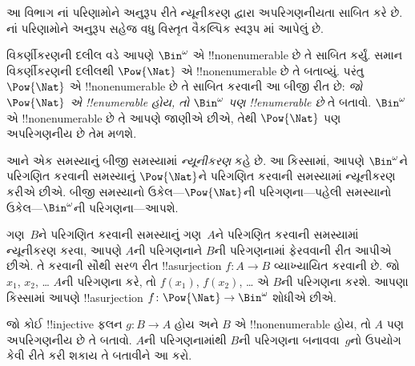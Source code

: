 \documentclass[../../../include/open-logic-section]{subfiles}
\begin{document}


\begin{editorial}
  આ વિભાગ નાં પરિણામોને અનુરૂપ રીતે
  ન્યૂનીકરણ દ્વારા અપરિગણનીયતા સાબિત કરે છે. નાં
  પરિણામોને અનુરૂપ
  સહેજ વધુ વિસ્તૃત વૈકલ્પિક સ્વરૂપ માં આપેલું છે.
\end{editorial}

વિકર્ણીકરણની દલીલ વડે આપણે $\Bin^\omega$ એ !!{nonenumerable}
છે તે સાબિત કર્યું. સમાન વિકર્ણીકરણની દલીલથી $\Pow{\Nat}$ એ
!!{nonenumerable} છે તે બતાવ્યું. પરંતુ $\Pow{\Nat}$ એ
!!{nonenumerable} છે તે સાબિત કરવાની
આ બીજી રીત છે:
\emph{જો $\Pow{\Nat}$ એ !!{enumerable} હોય, તો $\Bin^\omega$ પણ
!!{enumerable} છે} તે બતાવો. $\Bin^\omega$ એ !!{nonenumerable}
છે તે આપણે જાણીએ છીએ, તેથી $\Pow{\Nat}$ પણ અપરિગણનીય છે તેમ મળશે.

આને એક સમસ્યાનું બીજી સમસ્યામાં \emph{ન્યૂનીકરણ} કહે છે. આ કિસ્સામાં,
આપણે $\Bin^\omega$ને પરિગણિત કરવાની સમસ્યાનું $\Pow{\Nat}$ને
પરિગણિત કરવાની સમસ્યામાં ન્યૂનીકરણ કરીએ છીએ. બીજી સમસ્યાનો
ઉકેલ---$\Pow{\Nat}$ની પરિગણના---પહેલી સમસ્યાનો
ઉકેલ---$\Bin^\omega$ની પરિગણના---આપશે.

ગણ~$B$ને પરિગણિત કરવાની સમસ્યાનું ગણ~$A$ને પરિગણિત કરવાની
સમસ્યામાં ન્યૂનીકરણ કરવા, આપણે $A$ની પરિગણનાને $B$ની પરિગણનામાં
ફેરવવાની રીત આપીએ છીએ. તે કરવાની સૌથી સરળ રીત !!a{surjection}
$f\colon A \to B$ વ્યાખ્યાયિત કરવાની છે. જો $x_1$, $x_2$, \dots{}
$A$ની પરિગણના કરે, તો $f(x_1)$, $f(x_2)$, \dots{} એ $B$ની
પરિગણના કરશે. આપણા કિસ્સામાં આપણે !!a{surjection}
$f\colon \Pow{\Nat} \to \Bin^\omega$ શોધીએ છીએ.

\begin{prob}
જો કોઈ !!{injective} ફલન $g\colon B \to A$ હોય અને $B$ એ
!!{nonenumerable} હોય, તો $A$ પણ અપરિગણનીય છે તે બતાવો. $A$ની
પરિગણનામાંથી $B$ની પરિગણના બનાવવા~$g$નો ઉપયોગ કેવી રીતે કરી
શકાય તે બતાવીને આ કરો.
\end{prob}
\end{document}
